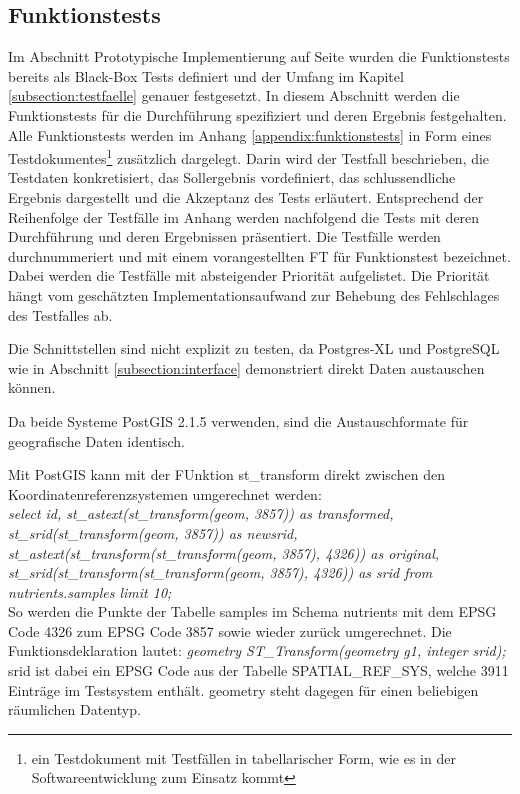 \subsection{Funktionstests}
Im Abschnitt Prototypische Implementierung auf Seite \pageref{grundlagen-funktionstests} wurden die Funktionstests bereits als Black-Box Tests definiert und der Umfang im Kapitel \ref{subsection:testfaelle} genauer festgesetzt.
In diesem Abschnitt werden die Funktionstests für die Durchführung spezifiziert und deren Ergebnis festgehalten.
Alle Funktionstests werden im Anhang \ref{appendix:funktionstests} in Form eines Testdokumentes\footnote{ein Testdokument mit Testfällen in tabellarischer Form, wie es in der Softwareentwicklung zum Einsatz kommt} zusätzlich dargelegt.
Darin wird der Testfall beschrieben, die Testdaten konkretisiert, das Sollergebnis vordefiniert, das schlussendliche Ergebnis dargestellt und die Akzeptanz des Tests erläutert.
Entsprechend der Reihenfolge der Testfälle im Anhang werden nachfolgend die Tests mit deren Durchführung und deren Ergebnissen präsentiert.
Die Testfälle werden durchnummeriert und mit einem vorangestellten FT für Funktionstest bezeichnet.
Dabei werden die Testfälle mit absteigender Priorität aufgelistet.
Die Priorität hängt vom geschätzten Implementationsaufwand zur Behebung des Fehlschlages des Testfalles ab.

Die Schnittstellen sind nicht explizit zu testen, da Postgres-XL und PostgreSQL wie in Abschnitt \ref{subsection:interface} demonstriert direkt Daten austauschen können.

Da beide Systeme PostGIS 2.1.5 verwenden, sind die Austauschformate für geografische Daten identisch.

Mit PostGIS kann mit der FUnktion st\_{}transform direkt zwischen den Koordinatenreferenzsystemen umgerechnet werden:\\
\textit{select id, st\_{}astext(st\_{}transform(geom, 3857)) as transformed, st\_{}srid(st\_{}transform(geom, 3857)) as newsrid, st\_{}astext(st\_{}transform(st\_{}transform(geom, 3857), 4326)) as original, st\_{}srid(st\_{}transform(st\_{}transform(geom, 3857), 4326)) as srid from nutrients.samples limit 10;}\\
So werden die Punkte der Tabelle samples im Schema nutrients mit dem EPSG Code 4326 zum EPSG Code 3857 sowie wieder zurück umgerechnet.
Die Funktionsdeklaration lautet:
\textit{geometry ST\_{}Transform(geometry g1, integer srid);}\\
srid ist dabei ein EPSG Code aus der Tabelle SPATIAL\_{}REF\_{}SYS, welche 3911 Einträge im Testsystem enthält.
geometry steht dagegen für einen beliebigen räumlichen Datentyp.



